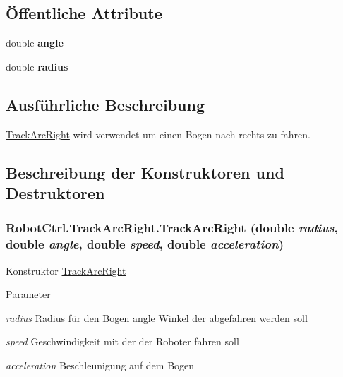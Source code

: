 \subsection*{Öffentliche Attribute}
\begin{DoxyCompactItemize}
\item 
\hypertarget{class_robot_ctrl_1_1_track_arc_right_a6e5fa9d8296e05e45d3db261997e224e}{
double {\bfseries angle}}
\label{class_robot_ctrl_1_1_track_arc_right_a6e5fa9d8296e05e45d3db261997e224e}

\item 
\hypertarget{class_robot_ctrl_1_1_track_arc_right_a499b381000fccf8f8c3af0ea1940a996}{
double {\bfseries radius}}
\label{class_robot_ctrl_1_1_track_arc_right_a499b381000fccf8f8c3af0ea1940a996}

\end{DoxyCompactItemize}


\subsection{Ausführliche Beschreibung}
\hyperlink{class_robot_ctrl_1_1_track_arc_right}{TrackArcRight} wird verwendet um einen Bogen nach rechts zu fahren. 

\subsection{Beschreibung der Konstruktoren und Destruktoren}
\hypertarget{class_robot_ctrl_1_1_track_arc_right_a54609ff71d77c37e9423cae42de7c347}{
\subsubsection[{TrackArcRight}]{\setlength{\rightskip}{0pt plus 5cm}RobotCtrl.TrackArcRight.TrackArcRight (double {\em radius}, \/  double {\em angle}, \/  double {\em speed}, \/  double {\em acceleration})}}
\label{class_robot_ctrl_1_1_track_arc_right_a54609ff71d77c37e9423cae42de7c347}
Konstruktor \hyperlink{class_robot_ctrl_1_1_track_arc_right}{TrackArcRight}


\begin{DoxyParams}{Parameter}
\item[{\em radius}]Radius f\"{u}r den Bogen  angle Winkel der abgefahren werden soll \item[{\em speed}]Geschwindigkeit mit der der Roboter fahren soll \item[{\em acceleration}]Beschleunigung auf dem Bogen \end{DoxyParams}


